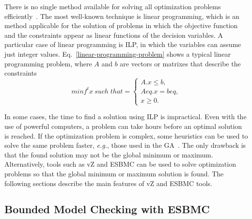 There is no single method available for solving all optimization problems efficiently~\cite{Rao2009}. The most well-known technique is linear programming, which is an method applicable for the solution of problems in which the objective function and the constraints appear as linear functions of the decision variables. A particular case of linear programming is ILP, in which the variables can assume just integer values. Eq.~\ref{linear-programming-problem} shows a typical linear programming problem, where $A$ and $b$ are vectors or matrixes that describe the constraints
\begin{equation}
\label{linear-programming-problem}
  minf^t x \: such \; that  = 
  \begin{cases}
    A.x \leq b, \\ 
    Aeq.x = beq, \\ 
    x \geq 0.
  \end{cases}
\end{equation}

In some cases, the time to find a solution using ILP is impractical. Even with the use of powerful computers, a problem can take hours before an optimal solution is reached. If the optimization problem is complex, some heuristics can be used to solve the same problem faster, {\it e.g.}, those used in the GA~\cite{Rao2009}. The only drawback is that the found solution may not be the global minimum or maximum. Alternatively, tools such as vZ and ESBMC can be used to solve optimization problems so that the global minimum or maximum solution is found. The following sections describe the main features of vZ and ESBMC tools.

\subsection{Bounded Model Checking with ESBMC}
\label{Bounded-Model-Checking-with-ESBMC}


